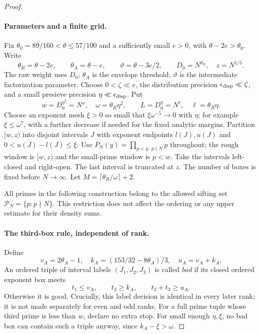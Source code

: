\documentclass[11pt]{article}
\begin{document}
\begin{proof}
\paragraph{Parameters and a finite grid.}
Fix $\theta_0=89/160<\theta\le57/100$ and a sufficiently small
$e>0$, with $\theta-2e>\theta_0$. Write
\[
 \theta_R=\theta-2e,\qquad \theta_A=\theta-e,
 \qquad \vartheta=\theta-3e/2,
 \qquad D_0=N^{\theta_R},\quad z=N^{1/5}.
\]
The raw weight uses $D_0$; $\theta_A$ is the envelope threshold;
$\vartheta$ is the intermediate factorization parameter.
Choose $0<\zeta\ll e$, the distribution precision
$\epsilon_{\rm disp}\ll\zeta$, and a small presieve precision
$\eta\ll\epsilon_{\rm disp}$. Put
\[
 w=D_0^{\eta^2}=N^\omega,\quad \omega=\theta_R\eta^2,
 \qquad L=D_0^\eta=N^\ell,\quad \ell=\theta_R\eta.
\]
Choose an exponent mesh $\xi>0$ so small that
$\xi\omega^{-5}\to0$ with $\eta$; for example $\xi\le\omega^7$,
with a further decrease if needed for the fixed analytic margins.
Partition $[w,z)$ into disjoint intervals $J$ with exponent endpoints
$l(J),u(J)$ and $0<u(J)-l(J)\le\xi$.
Use $P_N(y)=\prod_{p<y,\ p\nmid N}p$ throughout; the rough window is $[w,z)$ and the small-prime window is $p<w$. Take the intervals left-closed and right-open. The last interval is
truncated at $z$. The number of boxes is fixed before $N\to\infty$.
Let $M=\lceil\theta_R/\omega\rceil+2$.

All primes in the following construction belong to the allowed sifting
set $\mathcal P_N=\{p:p\nmid N\}$. This restriction does not affect
the ordering or any upper estimate for their density sums.

\paragraph{The third-box rule, independent of rank.}
Define
\[
 v_A=2\theta_A-1,\quad
 k_A=(153/32-8\theta_A)/3,\quad u_A=v_A+k_A.
\]
An ordered triple of interval labels $(J_1,J_2,J_3)$ is called
\emph{bad} if its closed ordered exponent box meets
\[
 t_1\le v_A,\qquad t_3\ge k_A,\qquad t_2+t_3\ge u_A.
\]
Otherwise it is good. Crucially, this label decision is identical
in every later rank; it is not made separately for even and odd ranks.
For a full prime tuple whose third prime is less than $w$, declare no
extra stop. For small enough $\eta,\xi$, no bad box can contain
such a triple anyway, since $k_A-\xi>\omega$.


\end{proof}
\end{document}
